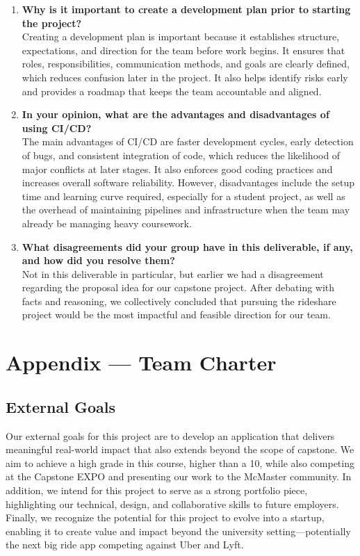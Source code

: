 \documentclass{article}
\begin{document}
\begin{enumerate}
  \item \textbf{Why is it important to create a development plan prior to starting the project?} \\ 
  Creating a development plan is important because it establishes structure, expectations, and direction for the team before work begins. It ensures that roles, responsibilities, communication methods, and goals are clearly defined, which reduces confusion later in the project. It also helps identify risks early and provides a roadmap that keeps the team accountable and aligned.
  \item \textbf{In your opinion, what are the advantages and disadvantages of using CI/CD?} \\ 
  The main advantages of CI/CD are faster development cycles, early detection of bugs, and consistent integration of code, which reduces the likelihood of major conflicts at later stages. It also enforces good coding practices and increases overall software reliability. However, disadvantages include the setup time and learning curve required, especially for a student project, as well as the overhead of maintaining pipelines and infrastructure when the team may already be managing heavy coursework.
  \item \textbf{What disagreements did your group have in this deliverable, if any, and how did you resolve them?} \\ 
  Not in this deliverable in particular, but earlier we had a disagreement regarding the proposal idea for our capstone project. After debating with facts and reasoning, we collectively concluded that pursuing the rideshare project would be the most impactful and feasible direction for our team.
\end{enumerate}

\newpage{}

\section*{Appendix --- Team Charter}

\subsection*{External Goals}

Our external goals for this project are to develop an application that delivers meaningful real-world impact that also extends beyond the scope of capstone. We aim to achieve a high grade in this course, higher than a 10, while also competing at the Capstone EXPO and presenting our work to the McMaster community. In addition, we intend for this project to serve as a strong portfolio piece, highlighting our technical, design, and collaborative skills to future employers. Finally, we recognize the potential for this project to evolve into a startup, enabling it to create value and impact beyond the university setting—potentially the next big ride app competing against Uber and Lyft.
\end{document}

